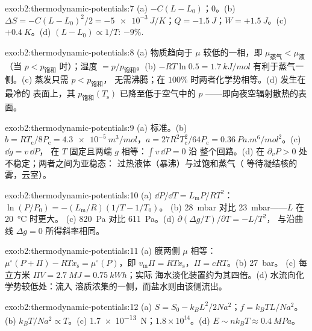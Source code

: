 \begin{solution}{exo:b2:thermodynamic-potentials:7}
(a) $-C(L - L_0)$；$0$。(b) $\Delta S = -C(L - L_0)^2/2 = \qty{-5e-3}{J/K}$；$Q =
\qty{-1.5}{J}$；$W = +\qty{1.5}{J}$。(c) $+\qty{0.4}{K}$。(d) $(L - L_0) \propto
1/T$: $-9\%$.
\end{solution}

\begin{solution}{exo:b2:thermodynamic-potentials:8}
(a) 物质趋向于 $\mu$ 较低的一相，即 $\mu_{\text{蒸气}} < \mu_{\text{液}}$（当 $p <
p_{\text{饱和}}$ 时）；湿度 $= p/p_{\text{饱和}}$。(b) $-RT\ln 0.5 = \qty{1.7}{kJ/mol}$
有利于蒸气一侧。(c) 蒸发只需 $p < p_{\text{饱和}}$，
无需沸腾；在 $100\%$ 时两者化学势相等。(d) 发生在最冷的
表面上，其 $p_{\text{饱和}}(T_{\text{s}})$ 已降至低于空气中的 $p$
——即向夜空辐射散热的表面。
\end{solution}

\begin{solution}{exo:b2:thermodynamic-potentials:9}
(a) 标准。(b) $b = RT_{\text{c}}/8P_{\text{c}} = \qty{4.3e-5}{m^3/mol}$，$a =
27R^2T_{\text{c}}^2/64P_{\text{c}} = \qty{0.36}{Pa.m^6/mol^2}$。(c) $\dd g = v\,\dd P$，
在 $T$ 固定且两端 $g$ 相等：$\int v\,\dd P = 0$ 沿
整个回路。(d) 在 $\partial_vP > 0$ 处不稳定；两者之间为亚稳态：
过热液体（暴沸）与过饱和蒸气（
等待凝结核的雾，云室）。
\end{solution}

\begin{solution}{exo:b2:thermodynamic-potentials:10}
(a) $\dd P/\dd T = L_{\text{m}}P/RT^2$：$\ln(P/P_0) = -(L_{\text{m}}/R)(1/T - 1/T_0)$。
(b) \qty{28}{mbar} 对比 \qty{23}{mbar}——$L$ 在 \qty{20}{\celsius} 时更大。
(c) \qty{820}{Pa} 对比 \qty{611}{Pa}。(d) $\partial(\Delta g/T)/\partial T = -L/T^2$，
与沿曲线 $\Delta g = 0$ 所得斜率相同。
\end{solution}

\begin{solution}{exo:b2:thermodynamic-potentials:11}
(a) 膜两侧 $\mu$ 相等：$\mu^\circ(P + \Pi) - RTx_{\text{s}} =
\mu^\circ(P)$，即 $v_{\text{m}}\Pi = RTx_{\text{s}}$，$\Pi = cRT$。(b) \qty{27}{bar}。
(c) 每立方米 $\Pi V = \qty{2.7}{MJ} = \qty{0.75}{kWh}$；实际
海水淡化装置约为其四倍。(d) 水流向化学势较低处：流入
溶质浓集的一侧，而盐水则由该侧流出。
\end{solution}

\begin{solution}{exo:b2:thermodynamic-potentials:12}
(a) $S = S_0 - k_BL^2/2Na^2$；$f = k_BTL/Na^2$。(b) $k_BT/Na^2 \propto T$。(c)
\qty{1.7e-13}{N}；$1.8 \times 10^{14}$。(d) $E \sim nk_BT \approx \qty{0.4}{MPa}$。
\end{solution}

